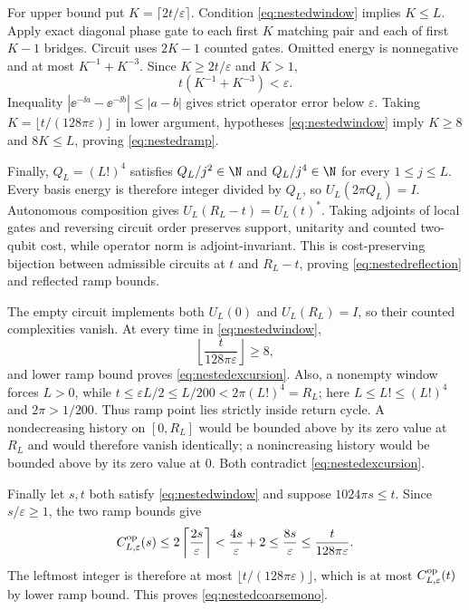 For upper bound put $K=\lceil2t/\varepsilon\rceil$.  Condition
\eqref{eq:nestedwindow} implies $K\le L$.  Apply exact diagonal phase gate to
each first $K$ matching pair and each of first $K-1$ bridges.  Circuit uses
$2K-1$ counted gates.  Omitted energy is nonnegative and at most
$K^{-1}+K^{-3}$.  Since $K\ge2t/\varepsilon$ and $K>1$,
\begin{equation}
 t(K^{-1}+K^{-3})<\varepsilon.
\end{equation}
Inequality $|\ee^{-\ii a}-\ee^{-\ii b}|\le|a-b|$ gives strict operator error
below $\varepsilon$.  Taking
$K=\lfloor t/(128\pi\varepsilon)\rfloor$ in lower argument, hypotheses
\eqref{eq:nestedwindow} imply $K\ge8$ and $8K\le L$, proving
\eqref{eq:nestedramp}.

Finally, $Q_L=(L!)^4$ satisfies $Q_L/j^2\in\N$ and $Q_L/j^4\in\N$ for every
$1\le j\le L$.  Every basis energy is therefore integer divided by $Q_L$,
so $U_L(2\pi Q_L)=I$.  Autonomous composition gives
$U_L(R_L-t)=U_L(t)^*$.  Taking adjoints of local gates and reversing circuit
order preserves support, unitarity and counted two-qubit cost, while operator
norm is adjoint-invariant.  This is cost-preserving bijection between
admissible circuits at $t$ and $R_L-t$, proving
\eqref{eq:nestedreflection} and reflected ramp bounds.

The empty circuit implements both $U_L(0)$ and $U_L(R_L)=I$, so their
counted complexities vanish.  At every time in \eqref{eq:nestedwindow},
\[
 \left\lfloor\frac{t}{128\pi\varepsilon}\right\rfloor\ge8,
\]
and lower ramp bound proves \eqref{eq:nestedexcursion}.  Also, a nonempty
window forces $L>0$, while
$t\le\varepsilon L/2\le L/200<2\pi(L!)^4=R_L$; here
$L\le L!\le(L!)^4$ and $2\pi>1/200$.  Thus ramp point lies strictly inside
return cycle.  A nondecreasing
history on $[0,R_L]$ would be bounded above by its zero value at $R_L$ and
would therefore vanish identically; a nonincreasing history would be bounded
above by its zero value at $0$.  Both contradict
\eqref{eq:nestedexcursion}.

Finally let $s,t$ both satisfy \eqref{eq:nestedwindow} and suppose
$1024\pi s\le t$.  Since $s/\varepsilon\ge1$, the two ramp bounds give
\[
 C^{\rm op}_{L,\varepsilon}(s)
 \le2\left\lceil\frac{2s}{\varepsilon}\right\rceil
 <\frac{4s}{\varepsilon}+2
 \le\frac{8s}{\varepsilon}
 \le\frac{t}{128\pi\varepsilon}.
\]
The leftmost integer is therefore at most
$\lfloor t/(128\pi\varepsilon)\rfloor$, which is at most
$C^{\rm op}_{L,\varepsilon}(t)$ by lower ramp bound.  This proves
\eqref{eq:nestedcoarsemono}.

